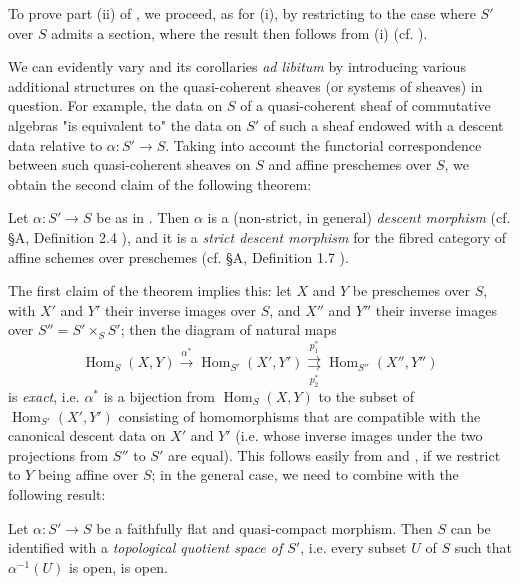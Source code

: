 To prove part (ii) of , we proceed, as for (i), by restricting to the case where $S'$ over $S$ admits a section, where the result then follows from (i) (cf. ).



We can evidently vary  and its corollaries \emph{ad libitum} by introducing various additional structures on the quasi-coherent sheaves (or systems of sheaves) in question.
For example, the data on $S$ of a quasi-coherent sheaf of commutative algebras "is equivalent to" the data on $S'$ of such a sheaf endowed with a descent data relative to $\alpha\colon S'\to S$.
Taking into account the functorial correspondence between such quasi-coherent sheaves on $S$ and affine preschemes over $S$, we obtain the second claim of the following theorem:


\begin{theorem}\label{fga3.i-b.1-theorem-2}
    Let $\alpha\colon S'\to S$ be as in .
    Then $\alpha$ is a (non-strict, in general) \emph{descent morphism} (cf. §A, Definition 2.4 ), and it is a \emph{strict descent morphism} for the fibred category of affine schemes over preschemes (cf. §A, Definition 1.7 ).
\end{theorem}


The first claim of the theorem implies this:
let $X$ and $Y$ be preschemes over $S$, with $X'$ and $Y'$ their inverse images over $S$, and $X''$ and $Y''$ their inverse images over $S''=S'\times_S S'$;
then the diagram of natural maps
\[
    \operatorname{Hom}_S(X,Y) \xrightarrow{\alpha^*}
    \operatorname{Hom}_{S'}(X',Y') \overset{p_1^*}{\underset{p_2^*}{\rightrightarrows}}
    \operatorname{Hom}_{S''}(X'',Y'')
\]
is \emph{exact}, i.e. $\alpha^*$ is a bijection from $\operatorname{Hom}_S(X,Y)$ to the subset of $\operatorname{Hom}_{S'}(X',Y')$ consisting of homomorphisms that are compatible with the canonical descent data on $X'$ and $Y'$ (i.e. whose inverse images under the two projections from $S''$ to $S'$ are equal).
This follows easily from  and , if we restrict to $Y$ being affine over $S$;
in the general case, we need to combine  with the following result:


\begin{lemma}\label{fga3.i-b.1-lemma-1.2}
    Let $\alpha\colon S'\to S$ be a faithfully flat and quasi-compact morphism.
    Then $S$ can be identified with a \emph{topological quotient space of $S'$}, i.e. every subset $U$ of $S$ such that $\alpha^{-1}(U)$ is open, is open.
\end{lemma}


